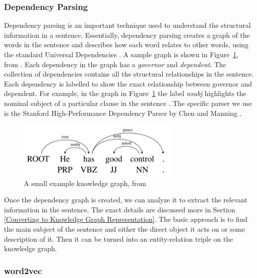\documentclass[pageno]{final_paper}
\begin{document}
\subsubsection{Dependency Parsing}
\label{Dependency Parsing}

Dependency parsing is an important technique used to understand the structural
information in a sentence. Essentially, dependency parsing creates a graph of
the words in the sentence and describes how each word relates to other words,
using the standard Universal Dependencies \cite{De2014}. A sample graph is shown
in Figure~\ref{fig: dependency parsing}, from \cite{Chen2014}. Each dependency
in the graph has a \textit{governor} and \textit{dependent}. The collection of
dependencies contains all the structural relationships in the sentence. Each
dependency is labelled to show the exact relationship between governor and
dependent. For example, in the graph in Figure~\ref{fig: dependency parsing} the
label \textit{nsubj} highlights the nominal subject of a particular clause in
the sentence \cite{De2014}. The specific parser we use is the Stanford
High-Performance Dependency Parser by Chen and Manning \cite{Chen2014}.

\begin{figure}[!tb]
    \centering
    \includegraphics[width=0.7\textwidth,keepaspectratio]{figures/Dependency_Graph.png}
    \caption{A small example knowledge graph, from \cite{Chen2014}}
    \label{fig: dependency parsing}
\end{figure}

Once the dependency graph is created, we can analyze it to extract the relevant
information in the sentence. The exact details are discussed more in Section
\ref{Converting to Knowledge Graph Representation}. The basic approach is to
find the main subject of the sentence and either the direct object it acts on or
some description of it. Then it can be turned into an entity-relation triple on
the knowledge graph.

\subsubsection{word2vec}
\label{word2vec}
\end{document}
